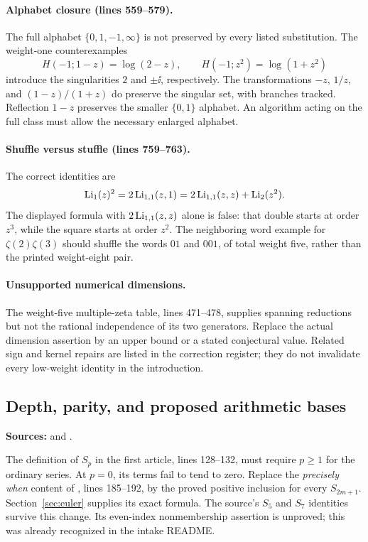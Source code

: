 \paragraph{Alphabet closure (lines 559--579).}
The full alphabet \(\{0,1,-1,\infty\}\) is not preserved by
every listed substitution. The weight-one counterexamples
\[
H(-1;1-z)=\log(2-z),\qquad
H(-1;z^2)=\log(1+z^2)
\]
introduce the singularities \(2\) and \(\pm\ii\), respectively.
The transformations \(-z\), \(1/z\), and
\((1-z)/(1+z)\) do preserve the singular set, with branches tracked.
Reflection \(1-z\) preserves the smaller \(\{0,1\}\) alphabet.
An algorithm acting on the full class must allow the necessary
enlarged alphabet.

\paragraph{Shuffle versus stuffle (lines 759--763).}
The correct identities are
\[
\operatorname{Li}_1(z)^2=2\operatorname{Li}_{1,1}(z,1)
          =2\operatorname{Li}_{1,1}(z,z)+\operatorname{Li}_2(z^2).
\]
The displayed formula with \(2\operatorname{Li}_{1,1}(z,z)\) alone is false:
that double starts at order \(z^3\), while the square starts at
order \(z^2\). The neighboring word example for
\(\zeta(2)\zeta(3)\) should shuffle the words \(01\) and \(001\),
of total weight five, rather than the printed weight-eight pair.

\paragraph{Unsupported numerical dimensions.}
The weight-five multiple-zeta table, lines 471--478, supplies
spanning reductions but not the rational independence of its two
generators. Replace the actual dimension assertion by an upper bound
or a stated conjectural value. Related sign and kernel repairs are
listed in the correction register; they do not invalidate every
low-weight identity in the introduction.

\subsection{Depth, parity, and proposed arithmetic bases}

\noindent\textbf{Sources:}
 and
.

The definition of \(S_p\) in the first article, lines 128--132,
must require \(p\ge1\) for the ordinary series. At \(p=0\), its
terms fail to tend to zero.
Replace the \emph{precisely when} content of ,
lines 185--192, by the proved positive inclusion for every
\(S_{2m+1}\). Section~\ref{sec:euler} supplies its exact formula.
The source's \(S_5\) and \(S_7\) identities survive this change.
Its even-index nonmembership assertion is unproved; this was
already recognized in the intake README.

